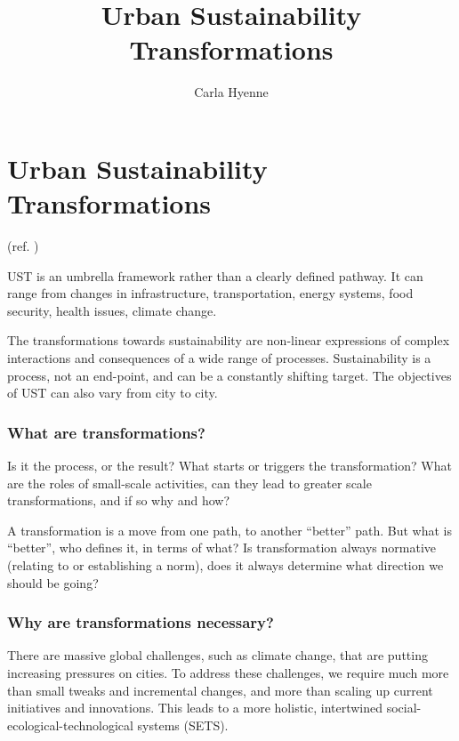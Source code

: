 \documentclass{article}
\title{Urban Sustainability Transformations}
\author{Carla Hyenne}
\begin{document}
\maketitle

\tableofcontents

\pagebreak

\section{Urban Sustainability Transformations}

(ref. \cite{mcphearson2021radical})

UST is an umbrella framework rather than a clearly defined pathway. It can range from changes in infrastructure, transportation, energy systems, food security, health issues, climate change. 

The transformations towards sustainability are non-linear expressions of complex interactions and consequences of a wide range of processes. Sustainability is a process, not an end-point, and can be a constantly shifting target.
The objectives of UST can also vary from city to city.

\subsubsection{What are transformations?}

Is it the process, or the result? What starts or triggers the transformation? What are the roles of small-scale activities, can they lead to greater scale transformations, and if so why and how?

A transformation is a move from one path, to another ``better'' path. But what is ``better'', who defines it, in terms of what? Is transformation always normative (relating to or establishing a norm), does it always determine what direction we should be going?

\subsubsection{Why are transformations necessary?}

There are massive global challenges, such as climate change, that are putting increasing pressures on cities. To address these challenges, we require much more than small tweaks and incremental changes, and more than scaling up current initiatives and innovations. 
This leads to a more holistic, intertwined social-ecological-technological systems (SETS).
\end{document}
